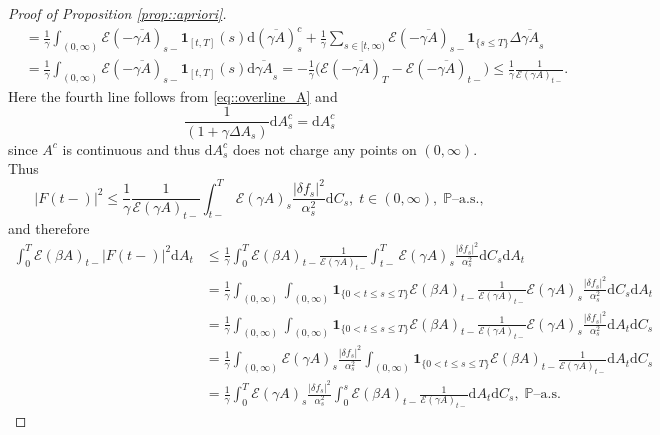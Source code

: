 \documentclass[10pt]{article} %
\newcommand\cE{\mathcal E}
\def \P{\mathbb{P}}
\def\d{\mathrm{d}}
\begin{document}
\begin{proof}[Proof of Proposition \ref{prop::apriori}]
\begin{align}
	&= \frac{1}{\gamma}\int_{(0,\infty)} \cE(-\overline{\gamma A})_{s-} \mathbf{1}_{[t,T]}(s) \d (\overline{\gamma A})^c_s + \frac{1}{\gamma}\sum_{s \in [t,\infty)} \cE(-\overline{\gamma A})_{s-}\mathbf{1}_{\{s \leq T\}}\Delta\overline{\gamma A}_s \nonumber\\
	&= \frac{1}{\gamma} \int_{(0,\infty)} \cE(-\overline{\gamma A})_{s-}\mathbf{1}_{[t,T]}(s) \d \overline{\gamma A}_s 
	= -\frac{1}{\gamma}\bigg(\cE(-\overline{\gamma A})_T - \cE(-\overline{\gamma A})_{t-}\bigg) 
	\leq \frac{1}{\gamma} \frac{1}{\cE(\gamma A)_{t-}}.
\end{align}
Here the fourth line follows from \eqref{eq::overline_A} and 
\begin{equation}\label{eq::dA_cont_jumps}
	\frac{1}{(1+\gamma\Delta A_s)} \d A^c_s = \d A^c_s
\end{equation}
since $A^c$ is continuous and thus $\d A^c_s$ does not charge any points on $(0,\infty)$.
Thus
\begin{equation*}
	|F(t-)|^2 \leq \frac{1}{\gamma} \frac{1}{\cE(\gamma A)_{t-}} \int_{t-}^T \cE(\gamma A)_s \frac{|\delta f_s|^2}{\alpha^2_s} \d C_s,\; t \in (0,\infty), \; \text{$\P$--a.s.},
\end{equation*}
and therefore
\begin{align}\label{eq::integral_F_minus}
	\int_0^T \cE(\beta A)_{t-} |F(t-)|^2 \d A_t 
	&\leq \frac{1}{\gamma}\int_0^T \cE(\beta A)_{t-}  \frac{1}{\cE(\gamma A)_{t-}} \int_{t-}^T \cE(\gamma A)_s \frac{|\delta f_s|^2}{\alpha^2_s} \d C_s \d A_t \nonumber\\
	&= \frac{1}{\gamma}\int_{(0,\infty)}\int_{(0,\infty)}\mathbf{1}_{\{0<t\leq s \leq T\}} \cE(\beta A)_{t-}  \frac{1}{\cE(\gamma A)_{t-}} \cE(\gamma A)_s \frac{|\delta f_s|^2}{\alpha^2_s} \d C_s \d A_t \nonumber\\
	&= \frac{1}{\gamma}\int_{(0,\infty)}\int_{(0,\infty)}\mathbf{1}_{\{0<t\leq s \leq T\}} \cE(\beta A)_{t-}  \frac{1}{\cE(\gamma A)_{t-}} \cE(\gamma A)_s \frac{|\delta f_s|^2}{\alpha^2_s} \d A_t \d C_s \nonumber\\
	&= \frac{1}{\gamma}\int_{(0,\infty)} \cE(\gamma A)_s \frac{|\delta f_s|^2}{\alpha^2_s} \int_{(0,\infty)}\mathbf{1}_{\{0<t\leq s \leq T\}} \cE(\beta A)_{t-}  \frac{1}{\cE(\gamma A)_{t-}} \d A_t \d C_s \nonumber\\
	&= \frac{1}{\gamma}\int_0^T \cE(\gamma A)_s \frac{|\delta f_s|^2}{\alpha^2_s} \int_0^s \cE(\beta A)_{t-}  \frac{1}{\cE(\gamma A)_{t-}} \d A_t \d C_s, \; \text{$\P$--a.s.}

\end{align}
\end{proof}
\end{document}
